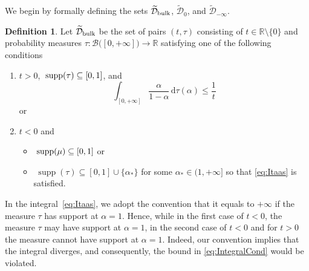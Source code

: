 \documentclass[aps,pra,11pt,onecolumn,nofootinbib,tightenlines]{revtex4-2}
\theoremstyle{definition}
\newtheorem{definition}[theorem]{Definition}
\newcommand{\D}{\mathcal{D}}
\newcommand{\R}{\mathbb{R}}
\newcommand{\mc}[1]{\mathcal{#1}}
\newcommand{\mb}[1]{\mathbb{#1}}
\begin{document}
We begin by formally defining the sets $\widetilde{\D}_{\rm bulk}$, $\widetilde{\D}_0$, and $\widetilde{\D}_{-\infty}$.
\begin{definition}
\label{def: D_bulk}
Let \(\widetilde{\D}_{\rm{bulk}}\) be the set of pairs $(t,\tau)$ consisting of $t\in\R\setminus\{0\}$ and probability measures $\tau:\mc B\big([0,+\infty]\big)\to\mb R$ satisfying one of the following conditions
\begin{enumerate}[itemsep=0pt,topsep=5pt]
    \item $t > 0$, $\;\textup{supp}(\tau) \subseteq [0,1]$, and
    \begin{equation}\label{eq:Itaas}
    \int_{[0,+\infty]}\frac{\alpha}{1-\alpha}\,\mathrm{d}\tau(\alpha)\leq\frac{1}{t}
    \end{equation}
    or
    \item $t < 0$ and
    \begin{itemize}
    \item[(a)] $\;\textup{supp}(\mu) \subseteq [0,1]$ or
    \item[(b)] $\;\operatorname{supp}(\tau) \subseteq [0,1] \cup \{\alpha_*\}$ for some $\alpha_* \in (1, +\infty]$ so that \eqref{eq:Itaas} is satisfied.
    \end{itemize}
\end{enumerate}
\end{definition}
In the integral~\eqref{eq:Itaas}, we adopt the convention that it equals to $+\infty$ if the measure $\tau$ has support at $\alpha=1$.
Hence, while in the first case of  $t<0$, the measure $\tau$ may have support at $\alpha=1$, in the second case of \(t < 0\) and for \(t > 0\) the measure cannot have support at \(\alpha = 1\). Indeed, our convention implies that the integral diverges, and consequently, the bound in \eqref{eq:IntegralCond} would be violated.
\end{document}
